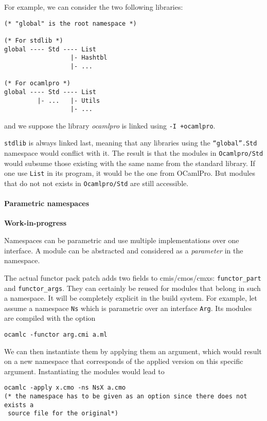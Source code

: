 \documentclass[11pt,a4paper]{article}
\begin{document}
For example, we can consider the two following libraries:

\begin{verbatim}
(* "global" is the root namespace *)

(* For stdlib *)
global ---- Std ---- List
                  |- Hashtbl
                  |- ...

(* For ocamlpro *)
global ---- Std ---- List
         |- ...   |- Utils
                  |- ...
\end{verbatim}
and we suppose the library \emph{ocamlpro} is linked using \texttt{-I +ocamlpro}.

\texttt{stdlib} is always linked last, meaning that any libraries using the
\texttt{``global''.Std} namespace would conflict with it. The result is that the
modules in \texttt{Ocamlpro/Std} would subsume those existing with the same name
from the standard library. If one use \texttt{List} in its program, it would be
the one from OCamlPro. But modules that do not not exists in
\texttt{Ocamlpro/Std} are still accessible.


\paragraph{Parametric namespaces}

\textbf{Work-in-progress}

Namespaces can be parametric and use multiple implementations over one
interface. A module can be abstracted and considered as a \emph{parameter} in
the namespace. 

The actual functor pack patch adds two fields to cmis/cmos/cmxs:
\lstinline{functor_part} and \lstinline{functor_args}. They can certainly be
reused for modules that belong in such a namespace. It will be completely
explicit in the build system. For example, let assume a namespace \texttt{Ns}
which is parametric over an interface \texttt{Arg}. Its modules are compiled
with the option 

\begin{verbatim}
ocamlc -functor arg.cmi a.ml
\end{verbatim}

We can then instantiate them by applying them an argument, which would result on
a new namespace that corresponds of the applied version on this specific
argument. Instantiating the modules would lead to 

\begin{verbatim}
ocamlc -apply x.cmo -ns NsX a.cmo 
(* the namespace has to be given as an option since there does not exists a
 source file for the original*)
\end{verbatim}
\end{document}
